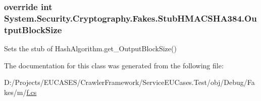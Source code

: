 \hypertarget{class_system_1_1_security_1_1_cryptography_1_1_fakes_1_1_stub_h_m_a_c_s_h_a384_a283e0119e74dd12769c9e7d5712e4936}{
\subsubsection[{Output\-Block\-Size}]{\setlength{\rightskip}{0pt plus 5cm}override int System.\-Security.\-Cryptography.\-Fakes.\-Stub\-H\-M\-A\-C\-S\-H\-A384.\-Output\-Block\-Size\hspace{0.3cm}{\ttfamily [get]}}}\label{class_system_1_1_security_1_1_cryptography_1_1_fakes_1_1_stub_h_m_a_c_s_h_a384_a283e0119e74dd12769c9e7d5712e4936}


Sets the stub of Hash\-Algorithm.\-get\-\_\-\-Output\-Block\-Size()



The documentation for this class was generated from the following file\-:\begin{DoxyCompactItemize}
\item 
D\-:/\-Projects/\-E\-U\-C\-A\-S\-E\-S/\-Crawler\-Framework/\-Service\-E\-U\-Cases.\-Test/obj/\-Debug/\-Fakes/m/\hyperlink{m_2f_8cs}{f.\-cs}\end{DoxyCompactItemize}
